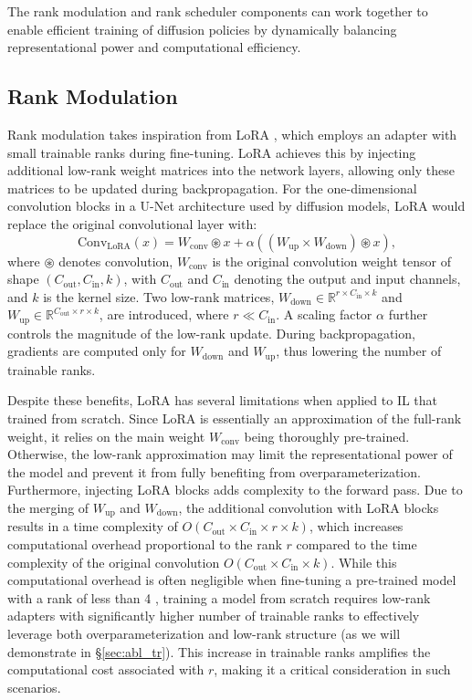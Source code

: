 The rank modulation and rank scheduler components can work together to enable efficient training of diffusion policies by dynamically balancing representational power and computational efficiency.  


\subsection{Rank Modulation}
\label{sec:rank_modulation}

Rank modulation takes inspiration from LoRA \cite{hu_lora}, which employs an adapter with small trainable ranks during fine-tuning. LoRA achieves this by injecting additional low-rank weight matrices into the network layers, allowing only these matrices to be updated during backpropagation. For the one-dimensional convolution blocks in a U-Net architecture used by diffusion models, LoRA would replace the original convolutional layer with:
\[
\text{Conv}_{\text{LoRA}}(x) = W_{\text{conv}} \circledast x + \alpha((W_{\text{up}} \times W_{\text{down}}) \circledast x),
\]
where $\circledast$ denotes convolution, $W_{\text{conv}}$ is the original convolution weight tensor of shape $(C_{\text{out}}, C_{\text{in}}, k)$, with $C_{\text{out}}$ and $C_{\text{in}}$ denoting the output and input channels, and $k$ is the kernel size. Two low-rank matrices, $W_{\text{down}} \in \mathbb{R}^{r \times C_{\text{in}} \times k}$ and $W_{\text{up}} \in \mathbb{R}^{C_{\text{out}} \times r \times k}$, are introduced, where $r \ll C_{\text{in}}$. A scaling factor $\alpha$ further controls the magnitude of the low-rank update. During backpropagation, gradients are computed only for $W_{\text{down}}$ and $W_{\text{up}}$, thus lowering the number of trainable ranks.

Despite these benefits, LoRA has several limitations when applied to IL that trained from scratch. Since LoRA is essentially an approximation of the full-rank weight, it relies on the main weight $W_{\text{conv}}$ being thoroughly pre-trained. Otherwise, the low-rank approximation may limit the representational power of the model and prevent it from fully benefiting from overparameterization. Furthermore, injecting LoRA blocks adds complexity to the forward pass. Due to the merging of $W_{\text{up}}$ and $W_{\text{down}}$, the additional convolution with LoRA blocks results in a time complexity of $O(C_{\text{out}} \times C_{\text{in}} \times r \times k)$, which increases computational overhead proportional to the rank $r$ compared to the time complexity of the original convolution $O(C_{\text{out}} \times C_{\text{in}} \times k)$. While this computational overhead is often negligible when fine-tuning a pre-trained model with a rank of less than 4 \cite{hu_lora}, training a model from scratch requires low-rank adapters with significantly higher number of trainable ranks to effectively leverage both overparameterization and low-rank structure (as we will demonstrate in \S\ref{sec:abl_tr}). This increase in trainable ranks amplifies the computational cost associated with $r$, making it a critical consideration in such scenarios.

